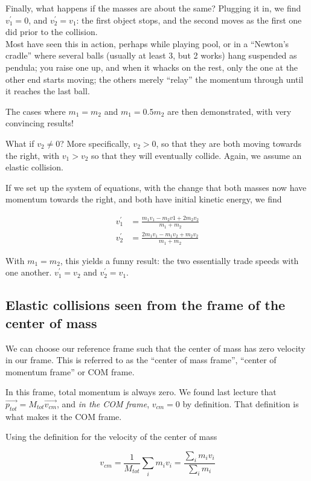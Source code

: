 Finally, what happens if the masses are about the same? Plugging it in, we find $v_1^{'} = 0$, and $v_2^{'} = v_1$: the first object stops, and the second moves as the first one did prior to the collision.\\
Most have seen this in action, perhaps while playing pool, or in a ``Newton's cradle'' where several balls (usually at least 3, but 2 works) hang suspended as pendula; you raise one up, and when it whacks on the rest, only the one at the other end starts moving; the others merely ``relay'' the momentum through until it reaches the last ball.

The cases where $m_1 = m_2$ and $m_1 = 0.5 m_2$ are then demonstrated, with very convincing results!

What if $v_2 \neq 0$? More specifically, $v_2 > 0$, so that they are both moving towards the right, with $v_1 > v_2$ so that they will eventually collide. Again, we assume an elastic collision.

If we set up the system of equations, with the change that both masses now have momentum towards the right, and both have initial kinetic energy, we find 

\begin{align}
v_1^{'} &= \frac{m_1 v_1 - m_2 v1 + 2 m_2 v_2}{m_1 + m_2}\\
v_2^{'} &= \frac{2 m_1 v_1 - m_1 v_2 + m_2 v_2}{m_1 + m_2}
\end{align}

With $m_1 = m_2$, this yields a funny result: the two essentially trade speeds with one another. $v_1^{'} = v_2$ and $v_2^{'} = v_1$.

\subsection{Elastic collisions seen from the frame of the center of mass}

We can choose our reference frame such that the center of mass has zero velocity in our frame. This is referred to as the ``center of mass frame'', ``center of momentum frame'' or COM frame.

In this frame, total momentum is always zero. We found last lecture that $\vec{p_{tot}} = M_{tot} \vec{v_{cm}}$, and \emph{in the COM frame}, $v_{cm} = 0$ by definition. That definition is what makes it the COM frame.

Using the definition for the velocity of the center of mass

\begin{equation}
v_{cm} = \frac{1}{M_{tot}} \sum_i m_i v_i = \frac{\sum_i m_i v_i}{\sum_i m_i}
\end{equation}

